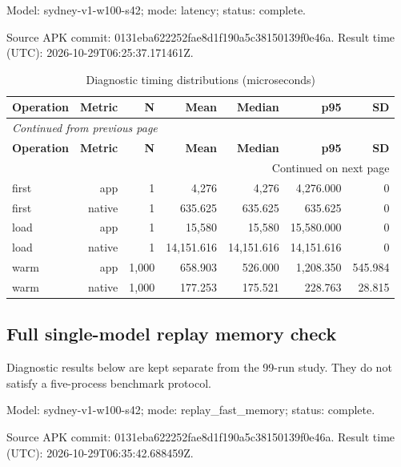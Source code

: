 \documentclass[10pt,a4paper]{article}
\begin{document}
Model:\allowbreak{} sydney-v1-w100-s42; mode:\allowbreak{} latency; status:\allowbreak{} complete.

Source APK commit:\allowbreak{} 0131eba622252fae\allowbreak{}8d1f190a5c381501\allowbreak{}39f0e46a. Result time (UTC):\allowbreak{} 2026-10-29T06:\allowbreak{}25:\allowbreak{}37.171461Z.

\begingroup\small\setlength{\tabcolsep}{4pt}\renewcommand{\arraystretch}{1.12}
\begin{longtable}{@{}lrrrrrr@{}}
\caption{Diagnostic timing distributions (microseconds)}\\
\toprule
\textbf{Operation} & \textbf{Metric} & \textbf{N} & \textbf{Mean} & \textbf{Median} & \textbf{p95} & \textbf{SD} \\
\midrule\endfirsthead
\multicolumn{7}{l}{\small\itshape Continued from previous page}\\
\toprule
\textbf{Operation} & \textbf{Metric} & \textbf{N} & \textbf{Mean} & \textbf{Median} & \textbf{p95} & \textbf{SD} \\
\midrule\endhead
\midrule\multicolumn{7}{r}{\small Continued on next page}\\\endfoot
\bottomrule\endlastfoot
first & app & 1 & 4,276 & 4,276 & 4,276.000 & 0 \\
first & native & 1 & 635.625 & 635.625 & 635.625 & 0 \\
load & app & 1 & 15,580 & 15,580 & 15,580.000 & 0 \\
load & native & 1 & 14,151.616 & 14,151.616 & 14,151.616 & 0 \\
warm & app & 1,000 & 658.903 & 526.000 & 1,208.350 & 545.984 \\
warm & native & 1,000 & 177.253 & 175.521 & 228.763 & 28.815 \\
\end{longtable}\endgroup
\subsection{Full single-model replay memory check}
Diagnostic results below are kept separate from the 99-run study. They do not satisfy a five-process benchmark protocol.

Model:\allowbreak{} sydney-v1-w100-s42; mode:\allowbreak{} replay\_\allowbreak{}fast\_\allowbreak{}memory; status:\allowbreak{} complete.

Source APK commit:\allowbreak{} 0131eba622252fae\allowbreak{}8d1f190a5c381501\allowbreak{}39f0e46a. Result time (UTC):\allowbreak{} 2026-10-29T06:\allowbreak{}35:\allowbreak{}42.688459Z.
\end{document}
